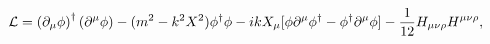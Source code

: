 \begin{equation}\label{4.2}
{\cal L}= \left( \partial_\mu \phi \right)^\dagger \left(
\partial^\mu \phi \right) -(m^2- k^2X^2)\phi^\dagger\phi -
ikX_\mu[\phi \partial^\mu \phi ^\dagger - \phi^\dagger
\partial^\mu \phi ]- \frac{1}{12}H_{\mu\nu\rho}H^{\mu\nu\rho},
\end{equation}

